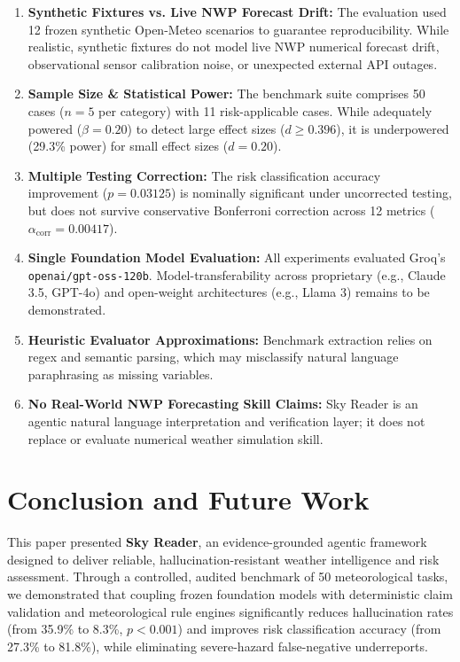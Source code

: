 \documentclass[conference]{IEEEtran}
\begin{document}
\begin{enumerate}
    \item \textbf{Synthetic Fixtures vs. Live NWP Forecast Drift:} The evaluation used 12 frozen synthetic Open-Meteo scenarios to guarantee reproducibility. While realistic, synthetic fixtures do not model live NWP numerical forecast drift, observational sensor calibration noise, or unexpected external API outages.
    \item \textbf{Sample Size \& Statistical Power:} The benchmark suite comprises 50 cases ($n=5$ per category) with 11 risk-applicable cases. While adequately powered ($\beta = 0.20$) to detect large effect sizes ($d \ge 0.396$), it is underpowered (29.3\% power) for small effect sizes ($d = 0.20$).
    \item \textbf{Multiple Testing Correction:} The risk classification accuracy improvement ($p = 0.03125$) is nominally significant under uncorrected testing, but does not survive conservative Bonferroni correction across 12 metrics ($\alpha_{\text{corr}} = 0.00417$).
    \item \textbf{Single Foundation Model Evaluation:} All experiments evaluated Groq's \texttt{openai/gpt-oss-120b}. Model-transferability across proprietary (e.g., Claude 3.5, GPT-4o) and open-weight architectures (e.g., Llama 3) remains to be demonstrated.
    \item \textbf{Heuristic Evaluator Approximations:} Benchmark extraction relies on regex and semantic parsing, which may misclassify natural language paraphrasing as missing variables.
    \item \textbf{No Real-World NWP Forecasting Skill Claims:} Sky Reader is an agentic natural language interpretation and verification layer; it does not replace or evaluate numerical weather simulation skill.
\end{enumerate}

\section{Conclusion and Future Work}

This paper presented \textbf{Sky Reader}, an evidence-grounded agentic framework designed to deliver reliable, hallucination-resistant weather intelligence and risk assessment. Through a controlled, audited benchmark of 50 meteorological tasks, we demonstrated that coupling frozen foundation models with deterministic claim validation and meteorological rule engines significantly reduces hallucination rates (from 35.9\% to 8.3\%, $p < 0.001$) and improves risk classification accuracy (from 27.3\% to 81.8\%), while eliminating severe-hazard false-negative underreports. 
\end{document}
